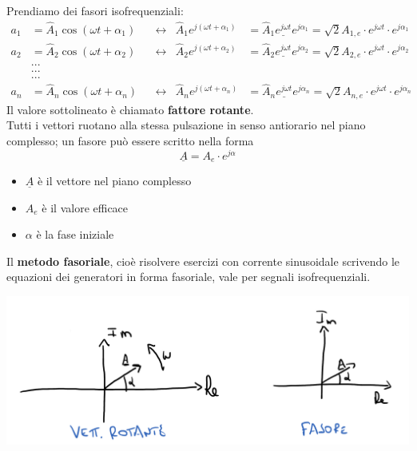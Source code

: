 \documentclass{article}
\begin{document}
Prendiamo dei fasori isofrequenziali:
\begin{align*}
    a_1&=\hat A_1\cos(\omega t + \alpha_1) & &\longleftrightarrow & \hat A_1 e^{j(\omega t + \alpha_1)} &= \hat A_1 \underline{e^{j \omega t}}e^{j \alpha_1}=\sqrt{2}A_{1,e} \cdot e^{j \omega t} \cdot e^{j \alpha_1}\\
    a_2&=\hat A_2\cos(\omega t + \alpha_2) & &\longleftrightarrow & \hat A_2 e^{j(\omega t + \alpha_2)} &= \hat A_2 \underline{e^{j \omega t}}e^{j \alpha_2}=\sqrt{2}A_{2,e} \cdot e^{j \omega t} \cdot e^{j \alpha_2}\\
    &...\\
    &...\\
    &...\\
    a_n&=\hat A_n\cos(\omega t + \alpha_n) & &\longleftrightarrow & \hat A_n e^{j(\omega t + \alpha_n)} &= \hat A_n \underline{e^{j \omega t}}e^{j \alpha_n}=\sqrt{2}A_{n,e} \cdot e^{j \omega t} \cdot e^{j \alpha_n}
\end{align*}
Il valore sottolineato è chiamato \textbf{fattore rotante}.
\vspace*{0.1cm}\\
Tutti i vettori ruotano alla stessa pulsazione in senso antiorario nel piano complesso; un fasore può essere scritto nella forma
\[
    \underline{A} = A_e \cdot e^{j \alpha}
\]
\begin{itemize}
    \item $\underline{A}$ è il vettore nel piano complesso
    \item $A_e$ è il valore efficace
    \item $\alpha$ è la fase iniziale
\end{itemize}
Il \textbf{metodo fasoriale}, cioè risolvere esercizi con corrente sinusoidale scrivendo le equazioni dei generatori in forma fasoriale, vale per segnali isofrequenziali.
\begin{center}
    \includegraphics[scale=0.2]{Image/Regime_sinusoidale_5.png}
\end{center}
\end{document}
